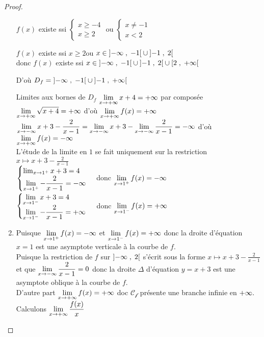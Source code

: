 \begin{example}
\begin{proof}
\begin{enumerate}
 $ f(x) $ existe ssi $ \begin{cases} x \geq -4 \\ x\geq 2\end{cases}$  ou $ \begin{cases} x\neq -1 \\ x< 2\end{cases}$
 
 $ f(x) $ existe ssi  $ x \geq 2 $\quad  ou $ x\in \left]-\infty \;,\; -1\right[\cup \left]-1 \;,\; 2\right[ $ \\ donc $ f(x) $ existe ssi $ x\in\left]-\infty \;,\; -1\right[\cup \left]-1 \;,\; 2\right[ \cup\left[2 \;,\; +\infty\right[$ 

 D'où $ D_{f}=\left]-\infty \;,\; -1\right[\cup \left]-1 \;,\; +\infty\right[$
 
 Limites aux bornes de $D_{f}  $
 $\displaystyle\lim_{x \to +\infty }x+4= +\infty $  par composée $\displaystyle\lim_{x \to +\infty}\sqrt{x+4}=+\infty  $ d'où $\displaystyle\lim_{x \to +\infty}f(x)=+\infty  $\\
 $\displaystyle\lim_{x \to -\infty}x+3-\frac{2}{x-1}=\displaystyle \lim_{x \to -\infty}x+3-\displaystyle\lim_{x \to -\infty}\frac{2}{x-1}=-\infty  $ d'où $\displaystyle\lim_{x \to +\infty}f(x)=-\infty  $\\
 L'étude de la limite en $ 1 $ se fait uniquement sur la restriction $ x \mapsto x+3-\frac{2}{x-1} $\\
$ \begin{cases}\lim_{x \to 1^{+}}x+3=4  \\ \displaystyle\lim_{x \to 1^{+}}-\frac{2}{x-1}=-\infty\end{cases}$  donc $\displaystyle\lim_{x \to 1^{+}}f(x)=-\infty  $\\
$ \begin{cases}\displaystyle\lim_{x \to 1^{-}}x+3=4  \\ \displaystyle\lim_{x \to 1^{-}}-\frac{2}{x-1}=+\infty\end{cases}$  donc $\displaystyle\lim_{x \to 1^{-}}f(x)=+\infty  $
\item Puisque $\displaystyle\lim_{x \to 1^{+}}f(x)=-\infty  $ et $\displaystyle\lim_{x \to 1^{-}}f(x)=+\infty  $ donc la droite d'équation $ x=1 $ est une asymptote verticale à la courbe de $ f. $\\
Puisque la restriction de $ f $ sur $ \left]-\infty \;,\; 2\right[ $ s'écrit sous la forme $ x \mapsto x+3-\frac{2}{x-1} $ et que $ \displaystyle\lim_{x \to -\infty}\frac{2}{x-1}= 0 $ donc la droite $ \Delta $ d'équation $ y=x+3 $ est une asymptote oblique à la courbe de $ f. $\\
D'autre part  $\displaystyle\lim_{x \to +\infty}f(x)=+\infty  $ doc $ \mathcal{C_{f}} $ présente une branche infinie en $ +\infty. $\\ Calculons $\displaystyle \lim_{x \to +\infty}\frac{f(x)}{x} $\\

\end{enumerate}
\end{proof}
\end{example}
